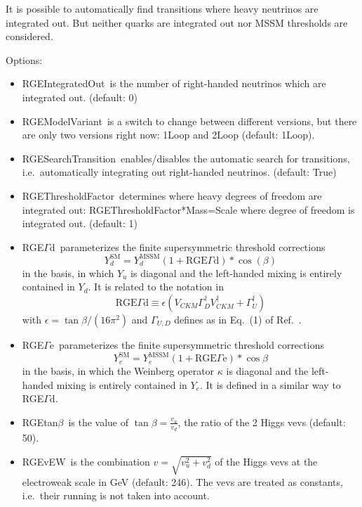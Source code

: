 \documentclass[10pt,a4paper,twoside]{scrartcl}
\begin{document}
It is possible to automatically find transitions where heavy neutrinos are
integrated out.  But neither quarks are integrated out nor MSSM thresholds are
considered. 

Options:
\begin{itemize}
\item RGEIntegratedOut\ is the number of right-handed neutrinos which are
  integrated out. (default: 0)
\item RGEModelVariant\ is a switch to change between different versions, but
  there are only two versions right now: 1Loop and 2Loop (default: 1Loop).
\item RGESearchTransition\ enables/disables the automatic search for
  transitions, i.e.\ automatically integrating out right-handed
neutrinos. (default: True)
\item RGEThresholdFactor\ determines where heavy degrees of freedom are integrated
  out: RGEThresholdFactor*Mass=Scale where degree of freedom is integrated
  out. (default: 1)
\item RGE$\Gamma$d\ parameterizes the finite supersymmetric threshold corrections
\begin{equation}
Y_d^\mathrm{SM} = Y_d^\mathrm{MSSM} (1 + \mathrm{RGE}\Gamma\mathrm{d}) * \cos(\beta)
\end{equation}
in the basis, in which $Y_u$ is diagonal and the left-handed mixing is entirely contained in $Y_d$. It is related to the notation in \cite{Blazek:1995nv}
\begin{equation}
\mathrm{RGE}\Gamma\mathrm{d} \equiv \epsilon (V_{CKM} \Gamma_D^\dagger V_{CKM}^\dagger +\Gamma_U^\dagger)
\end{equation}
with $\epsilon = \tan\beta/(16 \pi^2)$ and $\Gamma_{U,D}$ defines as in Eq.~(1) of Ref.~\cite{Blazek:1995nv}. 
\item RGE$\Gamma$e\ parameterizes the finite supersymmetric threshold corrections
\begin{equation}
Y_e^\mathrm{SM} = Y_e^\mathrm{MSSM} (1 + \mathrm{RGE}\Gamma\mathrm{e}) * \cos\beta
\end{equation}
in the basis, in which the Weinberg operator $\kappa$ is diagonal and the left-handed mixing is entirely contained in $Y_e$. It is defined in a similar way to RGE$\Gamma$d.
\item RGEtan$\beta$\ is the value of $\tan\beta=\frac{v_u}{v_d}$, the ratio of the 2
  Higgs vevs (default: 50).
\item RGEvEW\ is the combination $v=\sqrt{v_u^2+v_d^2}$ of the Higgs vevs at the
  electroweak scale in GeV (default: 246).  The vevs are treated as
  constants, i.e.\ their running is not taken into account.

\end{itemize}
\end{document}
